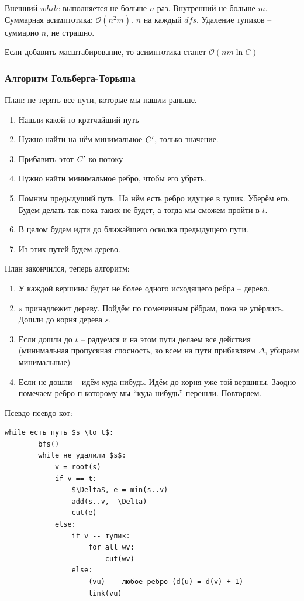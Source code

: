 Внешний $while$ выполняется не больше $n$ раз. Внутренний не больше $m$. 
Суммарная асимптотика: $\mathcal{O}(n^2m)$. $n$ на каждый $dfs$. Удаление тупиков -- суммарно $n$, не страшно.

Если добавить масштабирование, то асимптотика станет $\mathcal{O}(nm \ln C)$

\subsubsection{Алгоритм Гольберга-Торьяна}
План: не терять все пути, которые мы нашли раньше.

\begin{enumerate}
    \item Нашли какой-то кратчайший путь
    \item Нужно найти на нём минимальное $C^{\prime}$, только значение.
    \item Прибавить этот $C^{\prime}$ ко потоку 
    \item Нужно найти минимальное ребро, чтобы его убрать.
    \item Помним предыдуший путь. На нём есть ребро идущее в тупик. Уберём его. Будем делать так пока таких не будет, а тогда мы сможем пройти в $t$. 
    \item В целом будем идти до ближайшего осколка предыдущего пути.
    \item Из этих путей будем дерево.
\end{enumerate}

План закончился, теперь алгоритм:
\begin{enumerate}
    \item У каждой вершины будет не более одного исходящего ребра -- дерево.
    \item $s$ принадлежит дереву. Пойдём по помеченным рёбрам, пока не упёрлись. Дошли до корня дерева $s$.
    \item Если дошли до $t$ -- радуемся и на этом пути делаем все действия (минимальная пропускная спосность, ко всем на пути прибавляем $\Delta$, убираем минимальные)
    \item Если не дошли -- идём куда-нибудь. Идём до корня уже той вершины. Заодно помечаем ребро п которому мы ``куда-нибудь'' перешли. Повторяем.
\end{enumerate}

Псевдо-псевдо-кот:
\begin{lstlisting}[mathescape=true]
    while есть путь $s \to t$:
        bfs()
        while не удалили $s$:
            v = root(s)
            if v == t:
                $\Delta$, e = min(s..v)
                add(s..v, -\Delta)
                cut(e)
            else:
                if v -- тупик:
                    for all wv:
                        cut(wv)
                else:
                    (vu) -- любое ребро (d(u) = d(v) + 1)
                    link(vu)       
\end{lstlisting}

